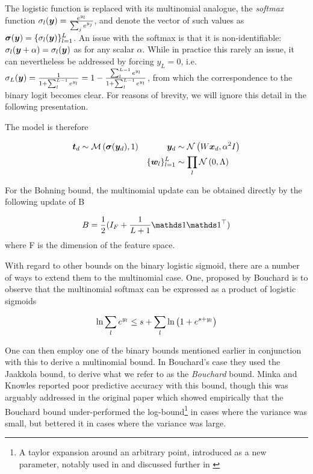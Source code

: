 The logistic function is replaced with its multinomial analogue, the \emph{softmax} function $\sigma_l(\bm y) = \frac{e^{y_l}}{\sum_j e^{y_j}}$, and denote the vector of such values as $\bm \sigma(\bm y) = \{ \sigma_l(\bm y) \}_{l=1}^{L}$. An issue with the softmax is that it is non-identifiable: $\sigma_l (\bm y + \alpha) = \sigma_l(\bm y)$ as for any scalar $\alpha$. While in practice this rarely an issue, it can nevertheless be addressed by forcing $y_L = 0$, i.e. $\sigma_L(\bm y) = \frac{1}{1 + \sum_l^{L-1} e^{y_l}} = 1 - \frac{\sum_l^{L-1} e^{y_l}}{1 + \sum_l^{L-1} e^{y_l}}$, from which the correspondence to the binary logit becomes clear. For reasons of brevity, we will ignore this detail in the following presentation.

The model is therefore

\begin{align}
\bm t_d & \sim \mathcal{M} \left( {\bm \sigma(\bm y_d)},{1} \right) & \bm y_d & \sim \mathcal{N} \left( {W \bm x_d}, {\alpha^2 I} \right) \\
 & & \{\bm w_l\}_{l = 1}^{L} & \sim \prod_l \mathcal{N} \left( {0}, {\Lambda} \right)
\end{align}

For the Bohning bound, the multinomial update can be obtained directly by the following update of B\cite{BohningLogReg1988}

\begin{equation}
B = \frac{1}{2} (I_F + \frac{1}{L+1}\one \one\T)
\end{equation}
where F is the dimension of the feature space.

With regard to other bounds on the binary logistic sigmoid, there are a number of ways to extend them to the multinomial case. One, proposed by Bouchard\cite{Bouchard2007} is to observe that the multinomial softmax can be expressed as a product of logistic sigmoids

\begin{equation}
\ln \sum_l e^{y_l} \leq s + \sum_l { \ln \left( 1 + e^{ s + y_l } \right) }
\end{equation}

One can then employ one of the binary bounds mentioned earlier in conjunction with this to derive a multinomial bound. In Bouchard's case they used the Jaakkola bound, to derive what we refer to as the \emph{Bouchard} bound. Minka and Knowles reported poor predictive accuracy with this bound\cite{MinkaKnowles}, though this was arguably addressed in the original paper which showed empirically that the Bouchard bound under-performed the log-bound\footnote{A taylor expansion around an arbitrary point, introduced as a new parameter, notably used in\cite{Blei2006} and discussed further in \cite{Wang2013a}} in cases where the variance was small, but bettered it in cases where the variance was large.


